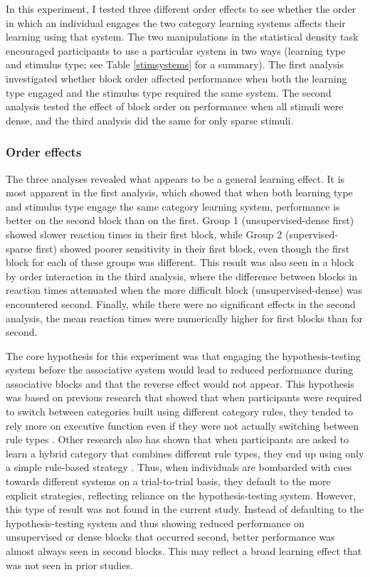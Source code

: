 \documentclass[../dissertation.tex]{subfiles}
\begin{document}
	In this experiment, I tested three different order effects to see whether the order in which an individual engages the two category learning systems affects their learning using that system. The two manipulations in the statistical density task encouraged participants to use a particular system in two ways (learning type and stimulus type; see Table \ref{stimsystems} for a summary). The first analysis investigated whether block order affected performance when both the learning type engaged and the stimulus type required the same system. The second analysis tested the effect of block order on performance when all stimuli were dense, and the third analysis did the same for only sparse stimuli. \par
	
\subsubsection{Order effects}
	The three analyses revealed what appears to be a general learning effect. It is most apparent in the first analysis, which showed that when both learning type and stimulus type engage the same category learning system, performance is better on the second block than on the first. Group 1 (unsupervised-dense first) showed slower reaction times in their first block, while Group 2 (supervised-sparse first) showed poorer sensitivity in their first block, even though the first block for each of these groups was different. This result was also seen in a block by order interaction in the third analysis, where the difference between blocks in reaction times attenuated when the more difficult block (unsupervised-dense) was encountered second. Finally, while there were no significant effects in the second analysis, the mean reaction times were numerically higher for first blocks than for second. \par
	The core hypothesis for this experiment was that engaging the hypothesis-testing system before the associative system would lead to reduced performance during associative blocks and that the reverse effect would not appear. This hypothesis was based on previous research that showed that when participants were required to switch between categories built using different category rules, they tended to rely more on executive function even if they were not actually switching between rule types \citep{Erickson2008}. Other research also has shown that when participants are asked to learn a hybrid category that combines different rule types, they end up using only a simple rule-based strategy \citep{Ashby2010}. Thus, when individuals are bombarded with cues towards different systems on a trial-to-trial basis, they default to the more explicit strategies, reflecting reliance on the hypothesis-testing system. However, this type of result was not found in the current study. Instead of defaulting to the hypothesis-testing system and thus showing reduced performance on unsupervised or dense blocks that occurred second, better performance was almost always seen in second blocks. This may reflect a broad learning effect that was not seen in prior studies. \par
\end{document}
